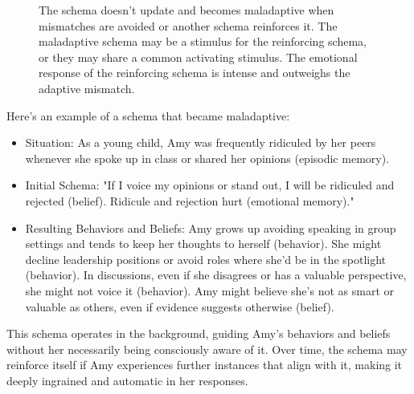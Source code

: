 \documentclass[12pt,letterpaper]{article}
\begin{document}
\begin{figure}[h!]
\begin{framed}
\begin{tikzpicture}[on grid, node distance=1.5cm]
\end{tikzpicture}
\end{framed}
\caption{The schema doesn't update and becomes maladaptive when mismatches are avoided or another schema reinforces it. The maladaptive schema may be a stimulus for the reinforcing schema, or they may share a common activating stimulus. The emotional response of the reinforcing schema is intense and outweighs the adaptive mismatch.}
\label{fig:maladaptiveSchema1}
\end{figure}
\FloatBarrier
Here's an example of a schema that became maladaptive:
\begin{itemize}
    \item Situation: As a young child, Amy was frequently ridiculed by her peers whenever she spoke up in class or shared her opinions (episodic memory).
    \item Initial Schema: "If I voice my opinions or stand out, I will be ridiculed and rejected (belief). Ridicule and rejection hurt (emotional memory)."
    \item Resulting Behaviors and Beliefs: Amy grows up avoiding speaking in group settings and tends to keep her thoughts to herself (behavior). She might decline leadership positions or avoid roles where she'd be in the spotlight (behavior). In discussions, even if she disagrees or has a valuable perspective, she might not voice it (behavior). Amy might believe she's not as smart or valuable as others, even if evidence suggests otherwise (belief).
\end{itemize}
This schema operates in the background, guiding Amy's behaviors and beliefs without her necessarily being consciously aware of it. Over time, the schema may reinforce itself if Amy experiences further instances that align with it, making it deeply ingrained and automatic in her responses.
\end{document}
